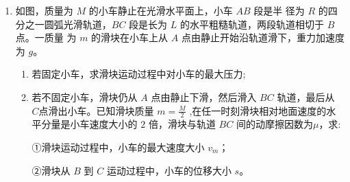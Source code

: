 \begin{enumerate}
\newpage
\item 
{}
如图，质量为 $ M $ 的小车静止在光滑水平面上，小车 $ AB $ 段是半
径为 $ R $ 的四分之一圆弧光滑轨道，$ BC $ 段是长为 $ L $ 的水平粗糙轨道，两段轨道相切于 $ B $ 点。一质量
为 $ m $ 的滑块在小车上从 $ A $ 点由静止开始沿轨道滑下，重力加速度为 $ g $。
\begin{enumerate}
\renewcommand{\labelenumi}{\arabic{enumi}.}
\item
若固定小车，求滑块运动过程中对小车的最大压力;



\item 
若不固定小车，滑块仍从 $ A $ 点由静止下滑，然后滑入 $ BC $ 轨道，最后从
$ C $点滑出小车。已知滑块质量 $m=\frac{M}{2}$
,在任一时刻滑块相对地面速度的水
平分量是小车速度大小的 $ 2 $ 倍，滑块与轨道 $ BC $ 间的动摩擦因数为$ \mu $，求$ : $

①滑块运动过程中，小车的最大速度大小 $ v_{m} $；

②滑块从 $ B $ 到 $ C $ 运动过程中，小车的位移大小 $ s $。




\end{enumerate}
\begin{figure}[h!]
\flushright

\end{figure}




\end{enumerate}

